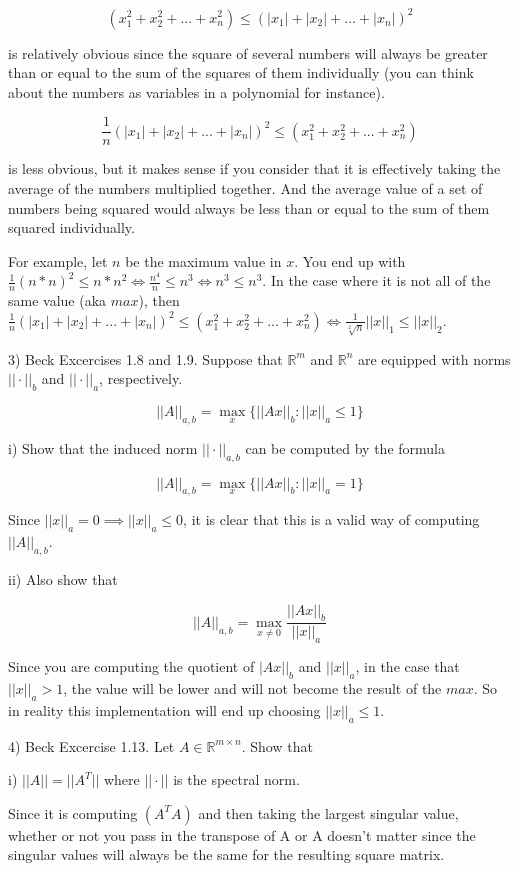 \documentclass{article}
\begin{document}
\[(x_1^2 + x_2^2 + ... + x_n^2)
\leq (|x_1| + |x_2| + ... + |x_n|)^2\]

is relatively obvious since the square of
several numbers will always be greater than or
equal to the sum of the squares of them individually
(you can think about the numbers as variables in a polynomial for instance).

\[\frac{1}{n}(|x_1| + |x_2| + ... + |x_n|)^2
\leq (x_1^2 + x_2^2 + ... + x_n^2)\]

is less obvious, but it makes sense if you consider that it is
effectively taking the average of the numbers multiplied together.
And the average value of a set of numbers being squared would
always be less than or equal to the sum of them squared individually.

For example, let $n$ be the maximum value in $x$.
You end up with $\frac{1}{n}(n*n)^2 \leq n*n^2 \iff \frac{n^4}{n} \leq n^3 \iff n^3 \leq n^3$.
In the case where it is not all of the same value (aka $max$), then
$\frac{1}{n}(|x_1| + |x_2| + ... + |x_n|)^2
\leq (x_1^2 + x_2^2 + ... + x_n^2)
\iff \frac{1}{\sqrt[2]{n}}||x||_1 \leq ||x||_2$.


3) Beck Excercises 1.8 and 1.9. Suppose that
$\mathbb{R}^m$ and $\mathbb{R}^n$ are equipped
with norms $||\cdot||_b$ and $||\cdot||_a$, respectively.

\[||A||_{a,b} = \max\limits_{x} \{||Ax||_b : ||x||_a \leq 1\}\]


\indent \indent i)
Show that the induced norm $||\cdot||_{a,b}$
can be computed by the formula

\[||A||_{a,b} = \max\limits_{x} \{||Ax||_b : ||x||_a = 1\}\]

Since $||x||_a = 0 \implies ||x||_a \leq 0$, it is clear that this is a valid way of computing $||A||_{a,b}$.


\indent \indent ii) Also show that

\[||A||_{a,b} = \max\limits_{x \neq 0} \frac{||Ax||_b}{||x||_a}\]


Since you are computing the quotient of $|Ax||_b$ and $||x||_a$,
in the case that $||x||_a > 1$,
the value will be lower and will not become the result of the $max$.
So in reality this implementation will end up choosing $||x||_a \leq 1$.


4) Beck Excercise 1.13. Let $A \in \mathbb{R}^{m \times n}$. Show that

\indent \indent i) $||A|| = ||A^{T}||$ where $||\cdot||$ is the spectral norm.

Since it is computing $(A^{T}A)$ and then taking the largest singular value,
whether or not you pass in the transpose of A or A
doesn't matter since the singular values will always
be the same for the resulting square matrix.
\end{document}

